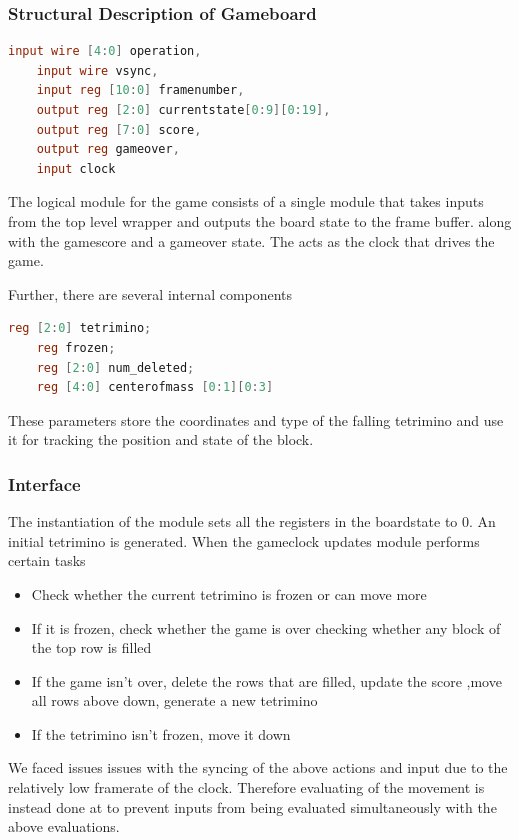 \subsubsection{Structural Description of Gameboard}
\label{subsubsection:Structuraldescr}
\begin{lstlisting}[language=Verilog]
    input wire [4:0] operation,  
    input wire vsync, 
    input reg [10:0] framenumber, 
    output reg [2:0] currentstate[0:9][0:19], 
    output reg [7:0] score,
    output reg gameover,
    input clock
\end{lstlisting}
The logical module for the game consists of a single module that takes inputs from the top level wrapper and outputs the board state to the frame buffer. \newline
along with the gamescore and a gameover state. The  acts as the clock that drives the game.

Further, there are several internal components 
\begin{lstlisting}[language=Verilog]
    reg [2:0] tetrimino;
    reg frozen;
    reg [2:0] num_deleted;
    reg [4:0] centerofmass [0:1][0:3]
\end{lstlisting}
These parameters store the coordinates and type of the falling 
tetrimino and use it for tracking the position and state of the block.\\

\subsubsection{Interface}
\label{subsubsection:interface}
The instantiation of the module sets all the registers in the boardstate to 0. An initial tetrimino is generated.
\newline 
When the gameclock updates module performs certain tasks 
\begin{itemize}
    \item Check whether the current tetrimino is frozen or can move more
    \item If it is frozen, check whether the game is over checking whether any block of the top row is filled
    \item If the game isn't over, delete the rows that are filled, update the score ,move all rows above down, generate a new tetrimino
    \item If the tetrimino isn't frozen, move it down 
\end{itemize}
We faced issues issues with the syncing of the above actions and input due to the relatively low framerate of the clock. 
Therefore evaluating of the movement is instead done at  to prevent inputs 
from being evaluated simultaneously with the above evaluations.
